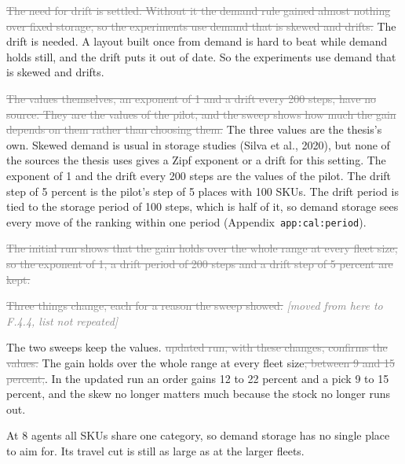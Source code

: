 \documentclass[11pt,a4paper]{article}
\newcommand{\new}[1]{\textcolor{newc}{#1}}
\newcommand{\old}[1]{\textcolor{gray}{\sout{#1}}}
\newenvironment{greenblock}{\color{newc}}{}
\newcommand{\lref}[1]{{\small\texttt{#1}}}
\newcommand{\moved}[1]{{\small\textcolor{gray}{\emph{[moved from #1]}}}}
\begin{document}
\old{The need for drift is settled. Without it the demand rule gained almost
nothing over fixed storage, so the experiments use demand that is skewed and
drifts.}
\new{The drift is needed. A layout built once from demand is hard to beat
while demand holds still, and the drift puts it out of date. So the
experiments use demand that is skewed and drifts.}

\old{The values themselves, an exponent of 1 and a drift every 200 steps,
have no source. They are the values of the pilot, and the sweep shows how
much the gain depends on them rather than choosing them.}
\begin{greenblock}
The three values are the thesis's own. Skewed demand is usual in storage
studies (Silva et al., 2020), but none of the sources the thesis uses gives a
Zipf exponent or a drift for this setting. The exponent of 1 and the drift
every 200 steps are the values of the pilot. The drift step of 5 percent is
the pilot's step of 5 places with 100 SKUs. The drift period is tied to the
storage period of 100 steps, which is half of it, so demand storage sees every
move of the ranking within one period (Appendix~\lref{app:cal:period}).
\end{greenblock}

\old{The initial run shows that the gain holds over the whole range at every
fleet size, so the exponent of 1, a drift period of 200 steps and a drift
step of 5 percent are kept.}

\old{Three things change, each for a reason the sweep showed.} \moved{here to F.4.4, list not repeated}

The \new{two sweeps keep the values.} \old{updated run, with these changes,
confirms the values.} The gain holds over the whole range at every fleet
size\old{, between 9 and 15 percent,}\new{. In the updated run an order gains
12 to 22 percent and a pick 9 to 15 percent,} and the skew no longer matters
much because the stock no longer runs out.

\new{At 8 agents all SKUs share one category, so demand storage has no single
place to aim for. Its travel cut is still as large as at the larger fleets.}
\end{document}

